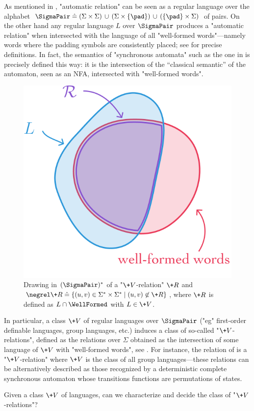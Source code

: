 As mentioned in ,
"automatic relation" can be seen as a regular language over the alphabet
$\SigmaPair \defeq (\Sigma \times \Sigma) \,\cup\,
(\Sigma \times \{\pad\}) \,\cup\, (\{\pad\} \times \Sigma)$ of pairs. On the other hand any regular language $L$ over $\SigmaPair$
produces a "automatic relation" when intersected with the language of all
"well-formed words"---namely words where the padding symbols are consistently placed;
see  for precise definitions. In fact, the semantics
of "synchronous automata" such as the one in  is precisely defined this way:
it is the intersection of the ``classical semantic'' of the automaton, seen as an NFA, intersected
with "well-formed words".

\begin{figure}[htbp]
	\begin{center}
		\includegraphics[width=.4\linewidth]{fig/algebra/projection.png}
	\end{center}
	\caption{
		\AP\label{fig:projection}
		Drawing in $(\SigmaPair)^*$ of a "$\+V$-relation" $\+R$ and $\negrel\+R \defeq \{(u,v) \in \Sigma^*\times \Sigma^* \mid (u,v) \not\in \+R\}$, where $\+R$ is defined as $L \cap \WellFormed$ with $L \in \+V$.
	} 
\end{figure}

In particular, a class $\+V$ of regular languages over
$\SigmaPair$
("eg" first-order definable languages, group languages, etc.) induces a class of so-called
"$\+V$-relations", defined as the relations over $\Sigma$ obtained as the intersection of some 
language of $\+V$ with "well-formed words", see .
For instance, the relation of 
is a "$\+V$-relation" where $\+V$ is the class of all group languages---these relations can be 
alternatively described as those recognized by a deterministic complete synchronous automaton whose 
transitions functions are permutations of states.

\begin{question}
	\AP\label{quest:V-relations}
	Given a class $\+V$ of languages, can we characterize and decide the class of "$\+V$-relations"?
\end{question}

